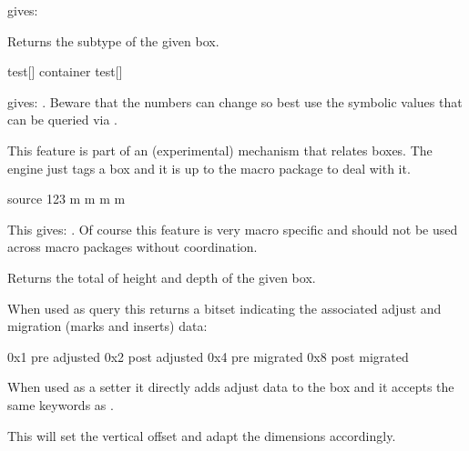 \typebuffer

gives: \inlinebuffer

\stopnewprimitive

\startnewprimitive[title={\prm {boxsubtype}}]

Returns the subtype of the given box.

\startbuffer
{}\hbox           {test}[\the{}]
\hbox container {test}[\the{}]
\stopbuffer

\typebuffer

gives: \inlinebuffer. Beware that the numbers can change so best use the symbolic
values that can be queried via \LUA.

\stopnewprimitive

\startnewprimitive[title={\prm {boxtarget}}]

This feature is part of an (experimental) mechanism that relates boxes. The
engine just tags a box and it is up to the macro package to deal with it.

\startbuffer
{}\hbox source 123 {m m m m}
\the{}
\stopbuffer

\typebuffer

This gives: \inlinebuffer. Of course this feature is very macro specific and
should not be used across macro packages without coordination.

\stopnewprimitive

\startnewprimitive[title={\prm {boxtotal}}]

Returns the total of height and depth of the given box.

\stopnewprimitive

\startnewprimitive[title={\prm {boxvadjust}}]

When used as query this returns a bitset indicating the associated adjust and
migration (marks and inserts) data:

\starttabulate[|T|l|]
\NC 0x1 \NC pre  adjusted \NC \NR
\NC 0x2 \NC post adjusted \NC \NR
\NC 0x4 \NC pre  migrated \NC \NR
\NC 0x8 \NC post migrated \NC \NR
\stoptabulate\

When used as a setter it directly adds adjust data to the box and it accepts the
same keywords as .

\stopnewprimitive

\startnewprimitive[title={\prm {boxxmove}}]

This will set the vertical offset and adapt the dimensions accordingly.

\stopnewprimitive

